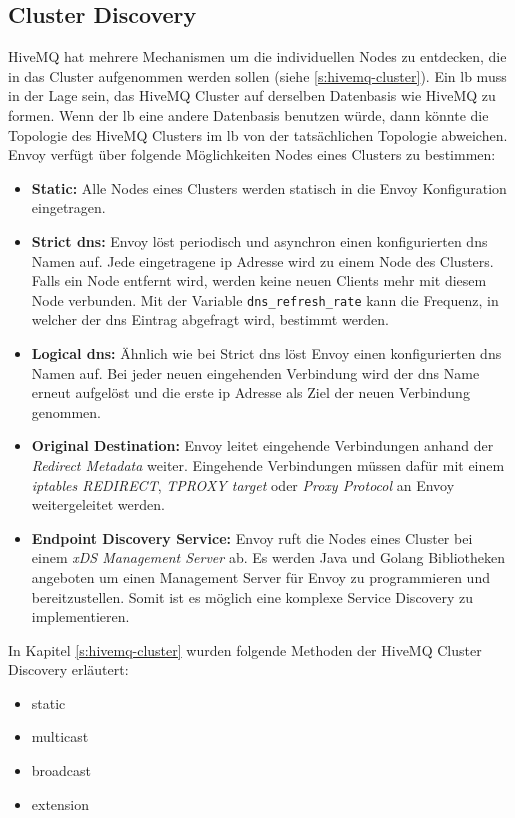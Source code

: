 \subsection{Cluster Discovery} \label{ss:cluster-discovery}
HiveMQ hat mehrere Mechanismen um die individuellen Nodes zu entdecken, die in das Cluster aufgenommen werden sollen (siehe \ref{s:hivemq-cluster}).
Ein \acl{lb} muss in der Lage sein, das HiveMQ Cluster auf derselben Datenbasis wie HiveMQ zu formen.
Wenn der \ac{lb} eine andere Datenbasis benutzen würde, dann könnte die Topologie des HiveMQ Clusters im \ac{lb} von der tatsächlichen Topologie abweichen.\\
Envoy verfügt über folgende Möglichkeiten Nodes eines Clusters zu bestimmen:
\begin{itemize}
  \item \textbf{Static:} Alle Nodes eines Clusters werden statisch in die Envoy Konfiguration eingetragen.
  \item \textbf{Strict \ac{dns}:} Envoy löst periodisch und asynchron einen konfigurierten \ac{dns} Namen auf. Jede eingetragene \ac{ip} Adresse wird zu einem Node des Clusters. Falls ein Node entfernt wird, werden keine neuen Clients mehr mit diesem Node verbunden. Mit der Variable \verb|dns_refresh_rate| kann die Frequenz, in welcher der \ac{dns} Eintrag abgefragt wird, bestimmt werden.
  \item \textbf{Logical \ac{dns}:} Ähnlich wie bei Strict \ac{dns} löst Envoy einen konfigurierten \ac{dns} Namen auf. Bei jeder neuen eingehenden Verbindung wird der \ac{dns} Name erneut aufgelöst und die erste \ac{ip} Adresse als Ziel der neuen Verbindung genommen.
  \item \textbf{Original Destination:} Envoy leitet eingehende Verbindungen anhand der \textit{Redirect Metadata} weiter. Eingehende Verbindungen müssen dafür mit einem \textit{iptables REDIRECT}, \textit{TPROXY target} oder \textit{Proxy Protocol} an Envoy weitergeleitet werden.
  \item \textbf{Endpoint Discovery Service:} Envoy ruft die Nodes eines Cluster bei einem \textit{xDS Management Server} ab. Es werden Java und Golang Bibliotheken angeboten um einen Management Server für Envoy zu programmieren und bereitzustellen. Somit ist es möglich eine komplexe Service Discovery zu implementieren.
\end{itemize}
\cite{ServiceDiscoveryEnvoy}
In Kapitel \ref{s:hivemq-cluster} wurden folgende Methoden der HiveMQ Cluster Discovery erläutert:
\begin{itemize}
  \item static
  \item multicast
  \item broadcast
  \item extension
\end{itemize}
